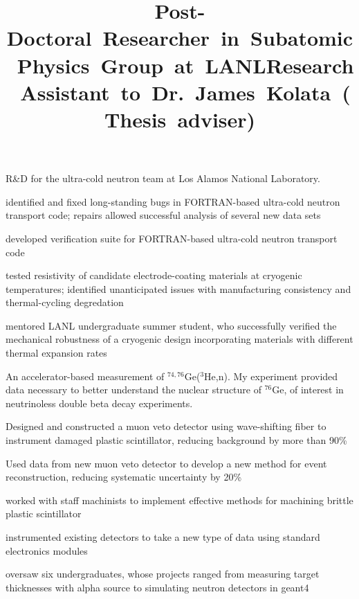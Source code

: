 \documentclass[overlapped,line,letterpaper]{res}
\begin{document}
\begin{resume}
\title{\mbox{Post-Doctoral Researcher in Subatomic Physics Group at LANL}}
\begin{position}
  R\&D for the ultra-cold neutron team at Los Alamos National Laboratory.
\begin{itemize}
\renewcommand{\labelitemi}{-}
{\setlength\itemindent{15pt} \item identified and fixed long-standing bugs in FORTRAN-based ultra-cold neutron transport code; repairs allowed successful analysis of several new data sets}
{\setlength\itemindent{15pt} \item developed verification suite for FORTRAN-based ultra-cold neutron transport code}
{\setlength\itemindent{15pt} \item tested resistivity of candidate electrode-coating materials at cryogenic temperatures; identified unanticipated issues with manufacturing consistency and thermal-cycling degredation}
{\setlength\itemindent{15pt} \item mentored LANL undergraduate summer student, who successfully verified the mechanical robustness of a cryogenic design incorporating materials with different thermal expansion rates}
\end{itemize}
\end{position}

\title{\mbox{Research Assistant to Dr.\ James Kolata (Thesis adviser)}}
\begin{position}
   An accelerator-based measurement of $^{74,76}$Ge($^3$He,n).  My experiment provided data necessary to better understand the nuclear structure of $^{76}$Ge, of interest in neutrinoless double beta decay experiments.
\begin{itemize}
\renewcommand{\labelitemi}{-}
{\setlength\itemindent{15pt} \item Designed and constructed a muon veto detector using wave-shifting fiber to instrument damaged plastic scintillator, reducing background by more than 90\%}
{\setlength\itemindent{15pt} \item Used data from new muon veto detector to develop a new method for event reconstruction, reducing systematic uncertainty by 20\%}
{\setlength\itemindent{15pt} \item worked with staff machinists to implement
  effective methods for machining brittle plastic scintillator}
{\setlength\itemindent{15pt} \item instrumented existing detectors to take a new
  type of data using standard electronics modules}
{\setlength\itemindent{15pt} \item oversaw six undergraduates, whose projects ranged from measuring target thicknesses with alpha source to simulating neutron detectors in geant4}
\end{itemize}
\end{position}


\end{resume}
\end{document}
